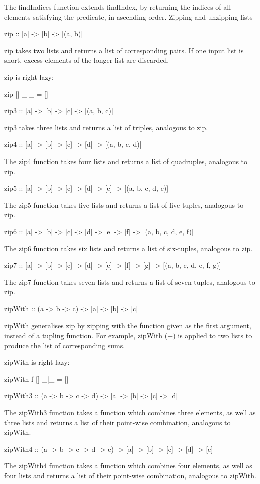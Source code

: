 The findIndices function extends findIndex, by returning the indices of all elements satisfying the predicate, in ascending order.
Zipping and unzipping lists

zip :: [a] -> [b] -> [(a, b)]

zip takes two lists and returns a list of corresponding pairs. If one input list is short, excess elements of the longer list are discarded.

zip is right-lazy:

zip [] \_|\_ = []

zip3 :: [a] -> [b] -> [c] -> [(a, b, c)]

zip3 takes three lists and returns a list of triples, analogous to zip.

zip4 :: [a] -> [b] -> [c] -> [d] -> [(a, b, c, d)]

The zip4 function takes four lists and returns a list of quadruples, analogous to zip.

zip5 :: [a] -> [b] -> [c] -> [d] -> [e] -> [(a, b, c, d, e)]

The zip5 function takes five lists and returns a list of five-tuples, analogous to zip.

zip6 :: [a] -> [b] -> [c] -> [d] -> [e] -> [f] -> [(a, b, c, d, e, f)]

The zip6 function takes six lists and returns a list of six-tuples, analogous to zip.

zip7 :: [a] -> [b] -> [c] -> [d] -> [e] -> [f] -> [g] -> [(a, b, c, d, e, f, g)]

The zip7 function takes seven lists and returns a list of seven-tuples, analogous to zip.

zipWith :: (a -> b -> c) -> [a] -> [b] -> [c]

zipWith generalises zip by zipping with the function given as the first argument, instead of a tupling function. For example, zipWith (+) is applied to two lists to produce the list of corresponding sums.

zipWith is right-lazy:

zipWith f [] \_|\_ = []

zipWith3 :: (a -> b -> c -> d) -> [a] -> [b] -> [c] -> [d]

The zipWith3 function takes a function which combines three elements, as well as three lists and returns a list of their point-wise combination, analogous to zipWith.

zipWith4 :: (a -> b -> c -> d -> e) -> [a] -> [b] -> [c] -> [d] -> [e]

The zipWith4 function takes a function which combines four elements, as well as four lists and returns a list of their point-wise combination, analogous to zipWith.

